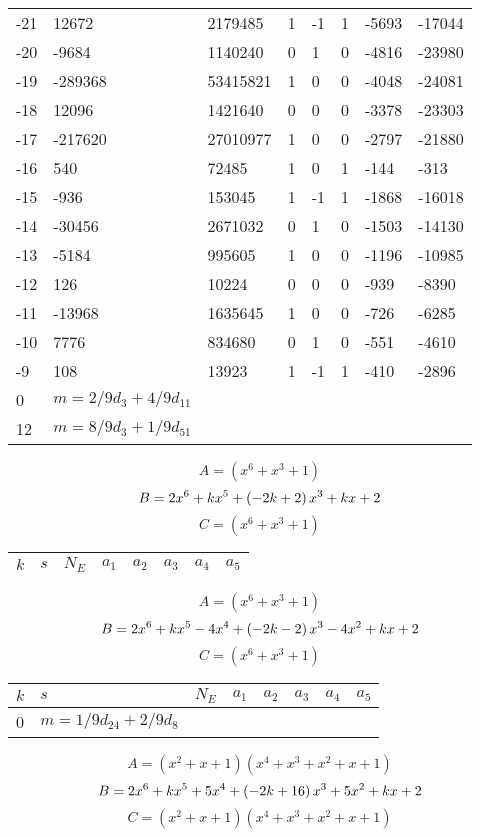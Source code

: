 \documentclass{amsart}
\begin{document}
\begin{longtable}{|l|l|l|lllll|}
-21&12672&2179485&1&-1&1&-5693&-17044\\
-20&-9684&1140240&0&1&0&-4816&-23980\\
-19&-289368&53415821&1&0&0&-4048&-24081\\
-18&12096&1421640&0&0&0&-3378&-23303\\
-17&-217620&27010977&1&0&0&-2797&-21880\\
-16&540&72485&1&0&1&-144&-313\\
-15&-936&153045&1&-1&1&-1868&-16018\\
-14&-30456&2671032&0&1&0&-1503&-14130\\
-13&-5184&995605&1&0&0&-1196&-10985\\
-12&126&10224&0&0&0&-939&-8390\\
-11&-13968&1635645&1&0&0&-726&-6285\\
-10&7776&834680&0&1&0&-551&-4610\\
-9&108&13923&1&-1&1&-410&-2896\\
0&$m=2/9d_{3}+4/9d_{11}$&&\multicolumn{5}{c|}{}\\
12&$m=8/9d_{3}+1/9d_{51}$&&\multicolumn{5}{c|}{}\\
\hline
\end{longtable}
$$A=(x^6
 + x^3
 + 1)$$
$$B=2\*x^6
 + k\*x^5
 + \left(-2\*k
 + 2\right) \*x^3
 + k\*x
 + 2$$
$$C=(x^6
 + x^3
 + 1)$$
\begin{longtable}{|l|l|l|lllll|}
\hline
$k$ & $s$ & $N_E$ & $a_1$ & $a_2$ & $a_3$ & $a_4$ & $a_5$\\
\hline
\hline
\end{longtable}
$$A=(x^6
 + x^3
 + 1)$$
$$B=2\*x^6
 + k\*x^5
 - 4\*x^4
 + \left(-2\*k
 - 2\right) \*x^3
 - 4\*x^2
 + k\*x
 + 2$$
$$C=(x^6
 + x^3
 + 1)$$
\begin{longtable}{|l|l|l|lllll|}
\hline
$k$ & $s$ & $N_E$ & $a_1$ & $a_2$ & $a_3$ & $a_4$ & $a_5$\\
\hline
0&$m=1/9d_{24}+2/9d_{8}$&&\multicolumn{5}{c|}{}\\
\hline
\end{longtable}
$$A=(x^2
 + x
 + 1)(x^4
 + x^3
 + x^2
 + x
 + 1)$$
$$B=2\*x^6
 + k\*x^5
 + 5\*x^4
 + \left(-2\*k
 + 16\right) \*x^3
 + 5\*x^2
 + k\*x
 + 2$$
$$C=(x^2
 + x
 + 1)(x^4
 + x^3
 + x^2
 + x
 + 1)$$
\end{document}
